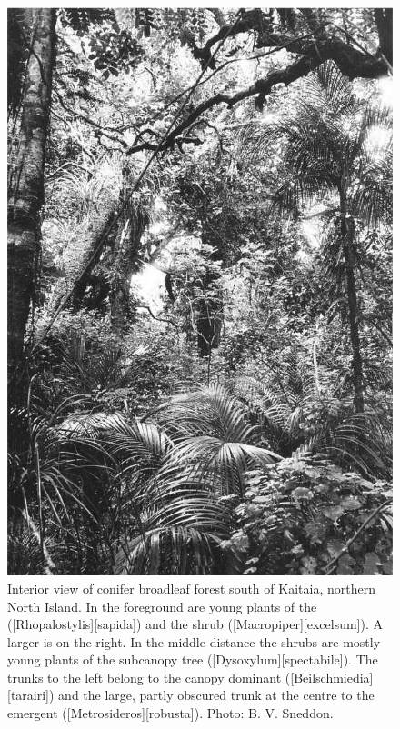 {\begin{figure}[!t]
\begin{minipage}[t]{\textwidth}
\begin{minipage}[t]{(\textwidth-\fgap) * \real{0.456}}
				\includegraphics[width=\textwidth]{graphics/figure8conifer.jpg}
				\caption[Interior view of conifer broadleaf forest south of Kaitaia]{Interior view of conifer broadleaf forest south of Kaitaia, northern North Island.
				In the foreground are young plants of the  ([Rhopalostylis][sapida]) and the shrub  ([excelsum]).
				A larger  is on the right.
				In the middle distance the shrubs are mostly young plants of the subcanopy tree  ([Dysoxylum][spectabile]).
				The trunks to the left belong to the canopy dominant  ([Beilschmiedia][tarairi]) and the large, partly obscured trunk at the centre to the emergent  ([Metrosideros][robusta]).
				Photo: B. V. Sneddon.}%
				\label{fig:8conifer}
			\end{minipage}
		\end{minipage}
	\end{figure}
}


